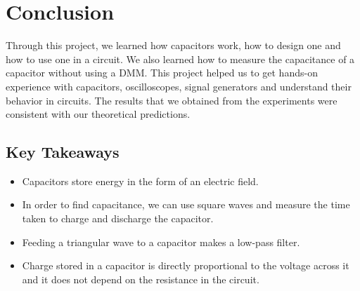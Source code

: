 \chapter{Conclusion}

Through this project, we learned how capacitors work, how to design one and how to use one in a circuit. We also learned how to measure the capacitance of a capacitor without using a DMM. This project helped us to get hands-on experience with capacitors, oscilloscopes, signal generators and understand their behavior in circuits. The results that we obtained from the experiments were consistent with our theoretical predictions. 

\section{Key Takeaways}
\begin{itemize}
    \item Capacitors store energy in the form of an electric field.
    \item In order to find capacitance, we can use square waves and measure the time taken to charge and discharge the capacitor.
    \item Feeding a triangular wave to a capacitor makes a low-pass filter.
    \item Charge stored in a capacitor is directly proportional to the voltage across it and it does not depend on the resistance in the circuit.
\end{itemize}
